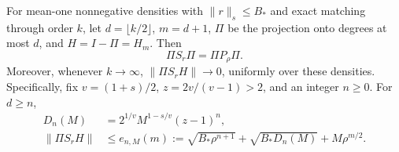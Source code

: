 \begin{lemma}
\label{lem:335-cross}
For mean-one nonnegative densities with $\|r\|_s\le B_*$ and exact
matching through order $k$, let $d=\lfloor k/2\rfloor$, $m=d+1$,
$\Pi$ be the projection onto degrees at most $d$, and $H=I-\Pi=H_m$.
Then
\begin{equation}\label{eq:335-compression}
 \Pi S_r\Pi=\Pi P_\rho\Pi.
\end{equation}
Moreover, whenever $k\to\infty$,
$\|\Pi S_rH\|\to0$, uniformly over these densities. Specifically,
fix $v=(1+s)/2$, $z=2v/(v-1)>2$, and an integer $n\ge0$. For $d\ge n$,
\begin{align}
 D_n(M)&=2^{1/v}M^{1-s/v}(z-1)^n,\label{eq:335-D}\\
 \|\Pi S_rH\|&\le e_{n,M}(m)
 :=\sqrt{B_*\rho^{n+1}}+\sqrt{B_*D_n(M)}+M\rho^{m/2}.
 \label{eq:335-cross-bound}
\end{align}
\end{lemma}
